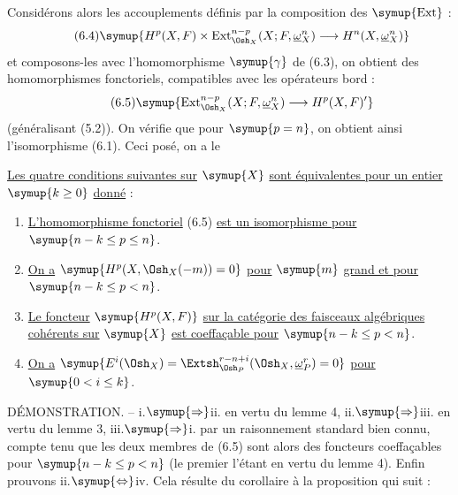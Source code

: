 Considérons alors les accouplements définis par la composition des $\symup{\operatorname{Ext}}$ :
\begin{equation}\tag{6.4}
  \symup{H^{p}(X,F)\times
  \operatorname{Ext}_{\Osh_X}^{n-p}(X;F,\underline{\omega}_X^{n})
  \longrightarrow H^{n}(X,\underline{\omega}_X^{n})}
\end{equation}
et composons-les avec l'homomorphisme $\symup{\gamma}$ de (6.3), on obtient des
homomorphismes fonctoriels, compatibles avec les opérateurs bord :
\begin{equation}\tag{6.5}
  \symup{\operatorname{Ext}_{\Osh_X}^{n-p}(X;F,\underline{\omega}_X^{n})
  \longrightarrow H^{p}(X,F)'}
\end{equation}
(généralisant (5.2)). On vérifie que pour $\symup{p=n}$, on obtient ainsi
l'isomorphisme (6.1). Ceci posé, on a le

 \uline{Les quatre conditions suivantes sur} $\symup{X}$ \uline{sont
équivalentes pour un entier} $\symup{k\geq0}$ \uline{donné} :
\begin{enumerate}
  \item[\textnormal{i.}] \uline{L'homomorphisme fonctoriel} (6.5) \uline{est un isomorphisme pour}
    $\symup{n-k\leq p\leq n}$.
  \item[\textnormal{ii.}] \uline{On a} $\symup{H^{p}(X,\Osh_X(-m))=0}$ \uline{pour} $\symup{m}$ \uline{grand et pour}
    $\symup{n-k\leq p<n}$.
  \item[\textnormal{iii.}] \uline{Le foncteur} $\symup{H^{p}(X,F)}$ \uline{sur la catégorie des faisceaux
    algébriques cohérents sur} $\symup{X}$ \uline{est coeffaçable pour} $\symup{n-k\leq p<n}$.
  \item[\textnormal{iv.}] \uline{On a}
    $\symup{E^{i}(\Osh_X)=\Extsh_{\Osh_P}^{r-n+i}(\Osh_X,\underline{\omega}_P^{r})=0}$
    \uline{pour} $\symup{0<i\leq k}$.
\end{enumerate}

\noindent DÉMONSTRATION. -- \textnormal{i.}$\symup{\Rightarrow}$\textnormal{ii.} en
vertu du lemme 4, \textnormal{ii.}$\symup{\Rightarrow}$\textnormal{iii.} en vertu du lemme 3,
\textnormal{iii.}$\symup{\Rightarrow}$\textnormal{i.} par un raisonnement standard bien connu,
compte tenu que les deux membres de (6.5) sont alors des foncteurs coeffaçables
pour $\symup{n-k\leq p<n}$ (le premier l'étant en vertu du lemme 4). Enfin prouvons
\textnormal{ii.}$\symup{\Leftrightarrow}$\textnormal{iv.} Cela résulte du corollaire à la
proposition qui suit :

